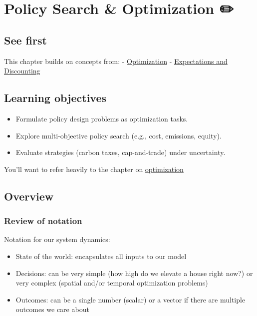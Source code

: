 \documentclass[
  letterpaper,
  DIV=11,
  numbers=noendperiod]{scrreprt}
\providecommand{\tightlist}{%
  \setlength{\itemsep}{0pt}\setlength{\parskip}{0pt}}
\begin{document}

\chapter{Policy Search \& Optimization
✏️}\label{policy-search-optimization}

\section*{See first}\label{see-first-10}


This chapter builds on concepts from: -
\href{./chapters/fundamentals/optimization.qmd}{Optimization} -
\href{./chapters/risk/expectations-cost-benefit.qmd}{Expectations and
Discounting}

\section*{Learning objectives}\label{learning-objectives-15}


\begin{itemize}
\tightlist
\item
  Formulate policy design problems as optimization tasks.
\item
  Explore multi-objective policy search (e.g., cost, emissions, equity).
\item
  Evaluate strategies (carbon taxes, cap-and-trade) under uncertainty.
\end{itemize}

You'll want to refer heavily to the chapter on
\hyperref[optimization]{optimization}

\section{Overview}\label{overview-4}

\subsection{Review of notation}\label{review-of-notation}

Notation for our system dynamics:

\begin{itemize}
\tightlist
\item
  State of the world: encapsulates all inputs to our model
\item
  Decisions: can be very simple (how high do we elevate a house right
  now?) or very complex (spatial and/or temporal optimization problems)
\item
  Outcomes: can be a single number (scalar) or a vector if there are
  multiple outcomes we care about
\end{itemize}
\end{document}
